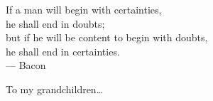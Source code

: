 \cleardoublepage
\thispagestyle{empty}


\vspace*{3cm}

\begin{raggedleft}
    If a man will begin with certainties,  \\
    he shall end in doubts;\\
    but if he will be content to begin with doubts,\\
    he shall end in certainties.\\
     --- Bacon \\
\end{raggedleft}

\vspace{4cm}

\begin{center}
    To my grandchildren\dots
\end{center}


